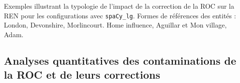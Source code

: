 \begin{table}[h!]
    \centering
    \footnotesize
   
    \caption{Exemples illustrant la typologie de l'impact de la correction de la ROC sur la REN pour les configurations avec \texttt{spaCy\_lg}. Formes de références des entités : London, Devonshire, Morlincourt. {\normalfont Home influence}, Aguillar et {\normalfont Mon village}, Adam.}
    \label{tab:typologie_erreurs-corr_ELTeCEng}
\end{table}


%    

%    


\subsection{Analyses quantitatives des contaminations de la ROC et de leurs corrections}
\label{subsec:quantitative_COR-OCR-IMPACT-NER}
